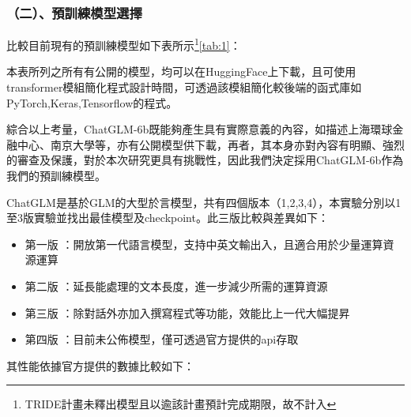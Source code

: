 \documentclass[8pt,a4paper,MingLiU,UTF8]{article}
\def\xeCJKembold{0.4}
\def\saveCJKnode{\dimen255\lastkern}
\def\restoreCJKnode{\kern-\dimen255\kern\dimen255}
\let\CJKoldsymbol\CJKsymbol
\let\CJKoldpunctsymbol\CJKpunctsymbol
\def\CJKfakeboldsymbol#1{%
	\special{pdf:literal direct 2 Tr \xeCJKembold\space w}%
	\CJKoldsymbol{#1}%
	\saveCJKnode
	\special{pdf:literal direct 0 Tr}%
	\restoreCJKnode}
\def\CJKfakeboldpunctsymbol#1{%
	\special{pdf:literal direct 2 Tr \xeCJKembold\space w}%
	\CJKoldpunctsymbol{#1}%
	\saveCJKnode
	\special{pdf:literal direct 0 Tr}%
	\restoreCJKnode}
\newcommand\CJKfakebold[1]{%
	\let\CJKsymbol\CJKfakeboldsymbol
	\let\CJKpunctsymbol\CJKfakeboldpunctsymbol
	#1%
	\let\CJKsymbol\CJKoldsymbol
	\let\CJKpunctsymbol\CJKoldpunctsymbol}
\begin{document}
	\subsubsection{（二）、預訓練模型選擇}
	比較目前現有的預訓練模型如下表所示\footnote{TRIDE計畫未釋出模型且以逾該計畫預計完成期限，故不計入}\ref{tab:1}：
	\begin{table}[H]
		\caption{比較及評估預訓練模型}%
		\label{tab:1}
	\end{table}
	本表所列之所有有公開的模型，均可以在HuggingFace上下載，且可使用transformer模組簡化程式設計時間，可透過該模組簡化較後端的函式庫如PyTorch,Keras,Tensorflow的程式。%

	綜合以上考量，ChatGLM-6b既能夠產生具有實際意義的內容，如描述上海環球金融中心、南京大學等，亦有公開模型供下載，再者，其本身亦對內容有明顯、強烈的審查及保護，對於本次研究更具有挑戰性，因此我們決定採用ChatGLM-6b作為我們的預訓練模型。


	ChatGLM是基於GLM的大型於言模型，共有四個版本（1,2,3,4），本實驗分別以1至3版實驗並找出最佳模型及checkpoint。此三版比較與差異如下：
	\begin{itemize}
		\item \CJKfakebold{第一版}：開放第一代語言模型，支持中英文輸出入，且適合用於少量運算資源運算
		\item \CJKfakebold{第二版}：延長能處理的文本長度，進一步減少所需的運算資源
		\item \CJKfakebold{第三版}：除對話外亦加入撰寫程式等功能，效能比上一代大幅提昇
		\item \CJKfakebold{第四版}：目前未公佈模型，僅可透過官方提供的api存取
	\end{itemize}
	其性能依據官方提供的數據比較如下：
	
\end{document}
